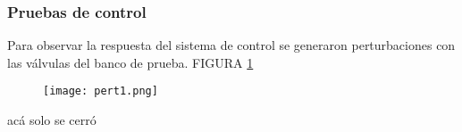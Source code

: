 \begin{comment}
	C:\Users\glori\Desktop\DANIELA\VISUAL_DANI\Automa\MATLAB\22-05\Comparacion PID y PLANTAS\FT001
	Respuesta_Strenj
\end{comment}

\subsubsection{Pruebas de control}
Para observar la respuesta del sistema de control se generaron perturbaciones con las válvulas del banco de prueba. FIGURA \ref{fig:pert1}
\begin{figure}[htb]
	\centering
	\texttt{[image: pert1.png]}
	\label{fig:pert1}
\end{figure}
 acá solo se cerró


\begin{comment}
\fcolorbox{red}{yellow}{Estuve viendo las curvas con escalones donde se ve que la ganancia estática se modifica frente a diferentes escalones. Si el objetivo fuese calcular un controlador para ese sistema una buena opción seria un controlador PI. De esta forma, la acción integral va a tratar de hacer que el error de estado estacionario sea cero frente a una entrada escalón. Además, los problemas que pueden existir en el envejecimiento de componentes, errores en el modelado y variaciones en la ganancia estática se van a mitigar con la parte integral del controlador. Obviamente al cambiar la planta la respuesta va a cambiar pero se va a cumplir la consigna de seguir la referencia. Para mostrar esto es posible calcular un controlador para un sistema y luego probar el controlador en los dos sistemas. Eso hice en el pdf que les adjunto con un sistema con 3 polos reales. Más detalles pueden encontrar en el libro de Ogata o Control avanzado de Karl Astrom, capitulo 3.
De esta forma, me da la sensación que para los objetivos de esta materia plantear un controlador PI para un controlador me parece bien.}
\end{comment}



